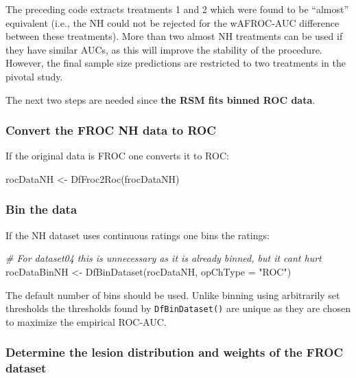 \documentclass[
]{book}
\newenvironment{Shaded}{\begin{snugshade}}{\end{snugshade}}
\newcommand{\AttributeTok}[1]{\textcolor[rgb]{0.77,0.63,0.00}{#1}}
\newcommand{\CommentTok}[1]{\textcolor[rgb]{0.56,0.35,0.01}{\textit{#1}}}
\newcommand{\FunctionTok}[1]{\textcolor[rgb]{0.00,0.00,0.00}{#1}}
\newcommand{\NormalTok}[1]{#1}
\newcommand{\OtherTok}[1]{\textcolor[rgb]{0.56,0.35,0.01}{#1}}
\newcommand{\StringTok}[1]{\textcolor[rgb]{0.31,0.60,0.02}{#1}}
\begin{document}
The preceding code extracts treatments 1 and 2 which were found \citep{zanca2009evaluation} to be ``almost'' equivalent (i.e., the NH could not be rejected for the wAFROC-AUC difference between these treatments). More than two almost NH treatments can be used if they have similar AUCs, as this will improve the stability of the procedure. However, the final sample size predictions are restricted to two treatments in the pivotal study.

The next two steps are needed since \textbf{the RSM fits binned ROC data}.

\hypertarget{convert-the-froc-nh-data-to-roc}{%
\subsubsection{Convert the FROC NH data to ROC}\label{convert-the-froc-nh-data-to-roc}}

If the original data is FROC one converts it to ROC:

\begin{Shaded}
\begin{Highlighting}[]
\NormalTok{rocDataNH }\OtherTok{\textless{}{-}} \FunctionTok{DfFroc2Roc}\NormalTok{(frocDataNH)}
\end{Highlighting}
\end{Shaded}

\hypertarget{bin-the-data}{%
\subsubsection{Bin the data}\label{bin-the-data}}

If the NH dataset uses continuous ratings one bins the ratings:

\begin{Shaded}
\begin{Highlighting}[]
\CommentTok{\# For dataset04 this is unnecessary as it is already binned, but it can\textquotesingle{}t hurt}
\NormalTok{rocDataBinNH }\OtherTok{\textless{}{-}} \FunctionTok{DfBinDataset}\NormalTok{(rocDataNH, }\AttributeTok{opChType =} \StringTok{"ROC"}\NormalTok{)}
\end{Highlighting}
\end{Shaded}

The default number of bins should be used. Unlike binning using arbitrarily set thresholds the thresholds found by \texttt{DfBinDataset()} are unique as they are chosen to maximize the empirical ROC-AUC.

\hypertarget{determine-the-lesion-distribution-and-weights-of-the-froc-dataset}{%
\subsubsection{Determine the lesion distribution and weights of the FROC dataset}\label{determine-the-lesion-distribution-and-weights-of-the-froc-dataset}}
\end{document}
